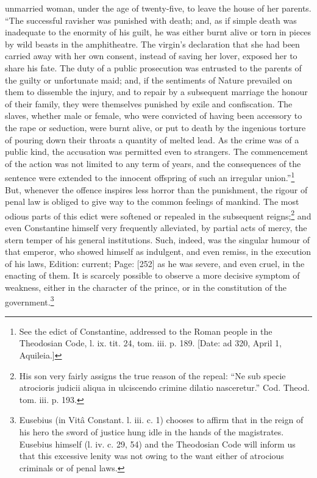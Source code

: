 unmarried woman, under the age of twenty-five, to leave the house of her parents. \texthebrew{“}The successful ravisher was punished with death; and, as if simple death was inadequate to the enormity of his guilt, he was either burnt alive or torn in pieces by wild beasts in the amphitheatre. The virgin\texthebrew{}’s declaration that she had been carried away with her own consent, instead of saving her lover, exposed her to share his fate. The duty of a public prosecution was entrusted to the parents of the guilty or unfortunate maid; and, if the sentiments of Nature prevailed on them to dissemble the injury, and to repair by a subsequent marriage the honour of their family, they were themselves punished by exile and confiscation. The slaves, whether male or female, who were convicted of having been accessory to the rape or seduction, were burnt alive, or put to death by the ingenious torture of pouring down their throats a quantity of melted lead. As the crime was of a public kind, the accusation was permitted even to strangers. The commencement of the action was not limited to any term of years, and the consequences of the sentence were extended to the innocent offspring of such an irregular union.\texthebrew{}”\footnote{See the edict of Constantine, addressed to the Roman people in the Theodosian Code, l. ix. tit. 24, tom. iii. p. 189. [Date: ad 320, April 1, Aquileia.]} But, whenever the offence inspires less horror than the punishment, the rigour of penal law is obliged to give way to the common feelings of mankind. The most odious parts of this edict were softened or repealed in the subsequent reigns;\footnote{His son very fairly assigns the true reason of the repeal: \texthebrew{“}Ne sub specie atrocioris judicii aliqua in ulciscendo crimine dilatio nasceretur.\texthebrew{}” Cod. Theod. tom. iii. p. 193.} and even Constantine himself very frequently alleviated, by partial acts of mercy, the stern temper of his general institutions. Such, indeed, was the singular humour of that emperor, who showed himself as indulgent, and even remiss, in the execution of his laws, Edition: current; Page: [252] as he was severe, and even cruel, in the enacting of them. It is scarcely possible to observe a more decisive symptom of weakness, either in the character of the prince, or in the constitution of the government.\footnote{Eusebius (in Vitâ Constant. l. iii. c. 1) chooses to affirm that in the reign of his hero the sword of justice hung idle in the hands of the magistrates. Eusebius himself (l. iv. c. 29, 54) and the Theodosian Code will inform us that this excessive lenity was not owing to the want either of atrocious criminals or of penal laws.}

